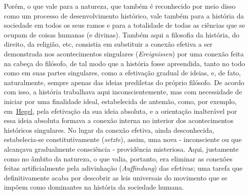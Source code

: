 Porém, o que vale para a natureza, que também é reconhecido por meio
disso como um processo de desenvolvimento histórico, vale também para a
história da sociedade em todos os seus ramos e para a totalidade de
todas as ciências que se ocupam de coisas humanas (e divinas). Também
aqui a filosofia da história, do direito, da religião, etc, consistia em
substituir a conexão efetiva a ser demonstrada nos acontecimentos
singulares (\emph{Ereignissen}) por uma conexão feita na cabeça do
filósofo, de tal modo que a história fosse apreendida, tanto no todo
como em suas partes singulares, como a efetivação gradual de ideias, e,
de fato, naturalmente, sempre apenas das ideias prediletas do próprio
filósofo. De acordo com isso, a história trabalhava aqui
inconscientemente, mas com necessidade de iniciar por uma finalidade
ideal, estabelecida de antemão, como, por exemplo,
em~\href{https://www.marxists.org/portugues/dicionario/verbetes/h/hegel.htm}{Hegel},
pela efetivação da sua ideia absoluta, e a orientação inalterável por
essa ideia absoluta formava a conexão interna no interior dos
acontecimentos históricos singulares. No lugar da conexão efetiva, ainda
desconhecida, estabelecia-se constitutivamente (\emph{setzte}), assim,
uma nova - inconsciente ou que alcançava gradualmente consciência -
providência misteriosa. Aqui, justamente como no âmbito da natureza, o
que valia, portanto, era eliminar as conexões feitas artificialmente
pela adivinhação (\emph{Auffindung}) das efetivas; uma tarefa que
definitivamente acaba por descobrir as leis universais do movimento que
se impõem como dominantes na história da sociedade humana.

